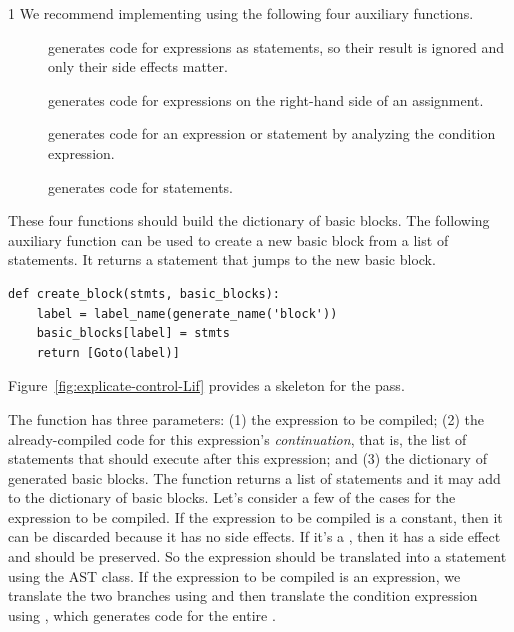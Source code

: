 \documentclass[7x10]{TimesAPriori_MIT}%
\def\pythonEd{1}
\def\edition{1}
\newcommand{\pythonColor}[0]{}
\numberwithin{theorem}{chapter}
\numberwithin{definition}{chapter}
\numberwithin{equation}{chapter}
\begin{document}
{\if\edition\pythonEd\pythonColor
%
We recommend implementing  using the
following four auxiliary functions.
\begin{description}
\item[] generates code for expressions as
  statements, so their result is ignored and only their side effects
  matter.
\item[] generates code for expressions
  on the right-hand side of an assignment.
\item[] generates code for an 
  expression or statement by analyzing the condition expression.
\item[] generates code for statements.
\end{description}
These four functions should build the dictionary of basic blocks. The
following auxiliary function can be used to create a new basic block
from a list of statements. It returns a  statement that
jumps to the new basic block.
\begin{center}
\begin{minipage}{\textwidth}
\begin{lstlisting}
def create_block(stmts, basic_blocks):
    label = label_name(generate_name('block'))
    basic_blocks[label] = stmts
    return [Goto(label)]
\end{lstlisting}
\end{minipage}
\end{center}
Figure~\ref{fig:explicate-control-Lif} provides a skeleton for the
 pass.

The  function has three parameters: (1) the
expression to be compiled; (2) the already-compiled code for this
expression's \emph{continuation}, that is, the list of statements that
should execute after this expression; and (3) the dictionary of
generated basic blocks. The  function returns
a list of \LangCIf{} statements and it may add to the dictionary of
basic blocks.
%
Let's consider a few of the cases for the expression to be compiled.
If the expression to be compiled is a constant, then it can be
discarded because it has no side effects. If it's a \CREAD{}, then it
has a side effect and should be preserved. So the expression should be
translated into a statement using the  AST class. If the
expression to be compiled is an  expression, we translate the
two branches using  and then translate the
condition expression using , which generates
code for the entire .

}
\end{document}
